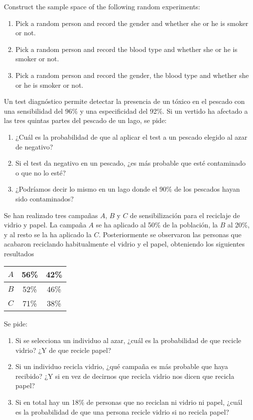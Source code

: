{Construct the sample space of the following random experiments:
\begin{enumerate}
\item Pick a random person and record the gender and whether she or he is smoker or not. 
\item Pick a random person and record the blood type and whether she or he is smoker or not.
\item Pick a random person and record the gender, the blood type and whether she or he is smoker or not.
\end{enumerate}
}
{}
{}


{Un test diagnóstico permite detectar la presencia de un tóxico en el pescado con una sensibilidad del 96\% y una especificidad del 92\%. Si un vertido ha afectado a las tres quintas partes del pescado de un lago, se pide:
\begin{enumerate}
\item ¿Cuál es la probabilidad de que al aplicar el test a un pescado  elegido al azar de negativo?
\item Si el test da negativo en un pescado, ¿es más probable que esté contaminado o que no lo esté?
\item ¿Podríamos decir lo mismo en un lago donde el 90\% de los pescados hayan sido contaminados?
\end{enumerate}
}
{}
{}


{Se han realizado tres campañas $A$, $B$ y $C$ de sensibilización para el reciclaje de vidrio y papel. La campaña $A$ se ha aplicado al 50\% de la población, la $B$ al 20\%, y al resto se la ha aplicado la $C$. Posteriormente se observaron las personas que acabaron reciclando habitualmente el vidrio y el papel, obteniendo los siguientes resultados
\begin{center}
\begin{tabular}{|c|c|c|}
\hline
$A$ & 56\% & 42\% \\
\hline
$B$ & 52\% & 46\% \\
\hline
$C$ & 71\% & 38\% \\
\hline
\end{tabular}
\end{center}
Se pide:
\begin{enumerate}
\item Si se selecciona un individuo al azar, ¿cuál es la probabilidad de que recicle vidrio? ¿Y de que recicle papel?
\item Si un individuo recicla vidrio, ¿qué campaña es más probable que haya recibido? ¿Y si en vez de decirnos que recicla vidrio nos dicen que recicla papel?
\item Si en total hay un 18\% de personas que no reciclan ni vidrio ni papel, ¿cuál es la probabilidad de que una persona recicle vidrio si no recicla papel?
\end{enumerate}
}
{}
{}


